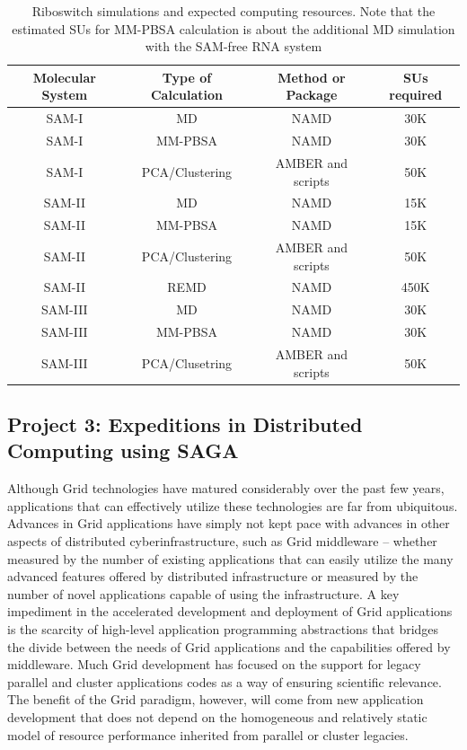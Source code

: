 \documentclass[a4paper,10pt]{article}
\begin{document}
\begin{table}[!h]
\begin{center}
  \caption{Riboswitch simulations and expected computing resources. Note that the estimated SUs for MM-PBSA calculation is about the additional MD simulation with the SAM-free RNA system}
\label{table:systems}
\begin{tabular}{| c | c | c | c |}
\hline
Molecular System & Type of Calculation &   Method or Package  &   SUs required \\
\hline
SAM-I & MD &  NAMD &  30K\\
SAM-I & MM-PBSA & NAMD & 30K \\
SAM-I & PCA/Clustering &  AMBER and scripts &  50K\\
SAM-II &MD &  NAMD &  15K\\
SAM-II & MM-PBSA & NAMD & 15K \\
SAM-II & PCA/Clustering & AMBER and scripts & 50K \\
SAM-II & REMD &  NAMD &  450K\\
SAM-III &MD &  NAMD &  30K\\
SAM-III & MM-PBSA & NAMD & 30K \\
SAM-III & PCA/Clusetring & AMBER and scripts & 50K \\
\hline
\end{tabular}
\end{center}
\end{table}


\subsection*{Project 3: Expeditions in Distributed Computing using SAGA}

Although Grid technologies have matured considerably over the past few years, applications that can effectively utilize these technologies are far from ubiquitous.  Advances in Grid applications have simply not kept pace with advances in other aspects of distributed cyberinfrastructure, such as Grid middleware -- whether measured by the number of existing applications that can easily utilize the many advanced features offered by distributed infrastructure or measured by the number of novel applications capable of using the infrastructure. A key impediment in the accelerated development and deployment of Grid applications is the scarcity of high-level application programming abstractions that bridges the divide between the needs of Grid applications and the capabilities offered by middleware.  Much Grid development has focused on the support for legacy parallel and cluster applications codes as a way of ensuring scientific relevance.  The benefit of the Grid paradigm, however, will come from new application development that does not depend on the homogeneous and relatively static model of resource performance inherited from parallel or cluster legacies.
\end{document}
